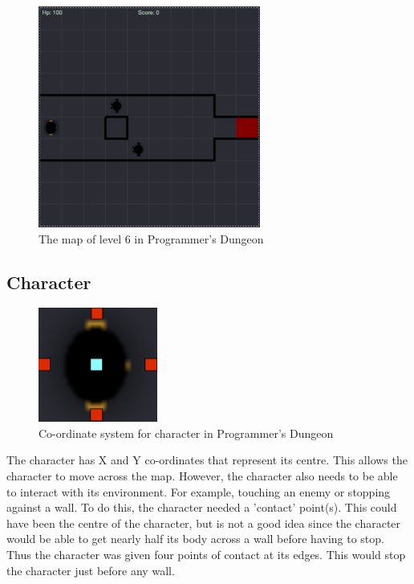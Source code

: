 \documentclass[a4paper,11.5pt]{report}
\numberwithin{figure}{section}
\numberwithin{table}{section}
\numberwithin{equation}{section}
\numberwithin{equation}{section}
\begin{document}
\begin{figure}[H]
 \centering
    \includegraphics[width=0.65\textwidth]{levelsix}
       \captionsetup{justification=centering}
\caption{The map of level 6 in Programmer's Dungeon}
\label{fig:levelsix}
\end{figure}


\subsection{Character}

\begin{figure}
    \includegraphics[width=0.35\textwidth,]{charactercontact}
       \captionsetup{justification=centering}
\caption{Co-ordinate system for character in Programmer's Dungeon}
\label{fig:charactercontact}
\end{figure}

The character has X and Y co-ordinates that represent its centre. This allows the character to move across the map. However, the character also needs to be able to interact with its environment. For example, touching an enemy or stopping against a wall. To do this, the character needed a 'contact' point(s). This could have been the centre of the character, but is not a good idea since the character would be able to get nearly half its body across a wall before having to stop. Thus the character was given four points of contact at its edges. This would stop the character just before any wall. 
\end{document}

